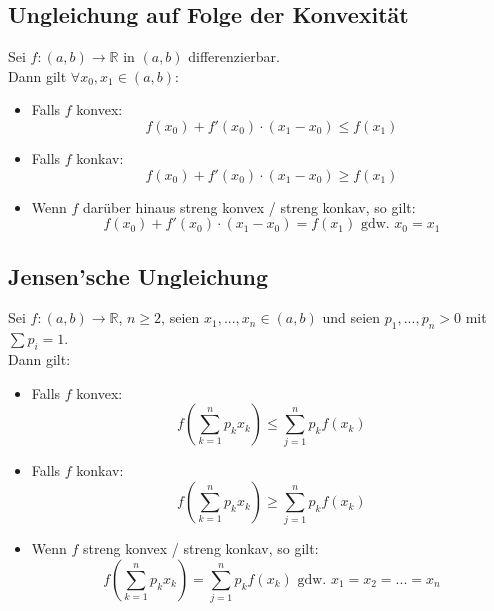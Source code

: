 \documentclass[halfparscip]{scrartcl}
\newcounter{subsection2}
\begin{document}
\subsection{Ungleichung auf Folge der Konvexität}
Sei $f : (a,b) \rightarrow \mathbb{R}$ in $(a,b)$ differenzierbar. \\
Dann gilt $\forall x_0, x_1 \in (a,b)$:
\begin{itemize}
	\item Falls $f$ konvex:
	\begin{equation*}
	f(x_0) + f'(x_0) \cdot (x_1 - x_0) \leq f(x_1)
	\end{equation*}
	\item Falls $f$ konkav:
	\begin{equation*}
	f(x_0) + f'(x_0) \cdot (x_1 - x_0) \geq f(x_1)
	\end{equation*}
	\item Wenn $f$ darüber hinaus streng konvex / streng konkav, so gilt:
	\begin{equation*}
	f(x_0) + f'(x_0) \cdot (x_1 - x_0) = f(x_1) \text{ gdw. } x_0 = x_1
	\end{equation*}
	
\end{itemize}

\subsection*{Jensen'sche Ungleichung}
Sei $f : (a,b) \rightarrow \mathbb{R}$, $n \geq 2$, seien $x_1, ..., x_n \in (a,b)$ und seien $p_1, ..., p_n > 0$ mit $\sum p_i = 1$.\\
Dann gilt:
\begin{itemize}
	\item Falls $f$ konvex:
	\begin{equation*}
	f\left(\sum_{k=1}^{n}p_kx_k\right) \leq \sum_{j=1}^{n}p_kf(x_k)
	\end{equation*}
	\item Falls $f$ konkav:
	\begin{equation*}
	f\left(\sum_{k=1}^{n}p_kx_k\right) \geq \sum_{j=1}^{n}p_kf(x_k)
	\end{equation*}
	\item Wenn $f$ streng konvex / streng konkav, so gilt:
	\begin{equation*}
	f\left(\sum_{k=1}^{n}p_kx_k\right) = \sum_{j=1}^{n}p_kf(x_k) \text{ gdw. } x_1 = x_2 = ... = x_n
	\end{equation*}
\end{itemize}
\end{document}
